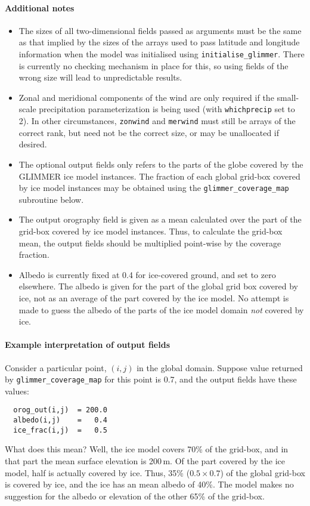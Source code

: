 \paragraph{Additional notes}
%
\begin{itemize}
\item The sizes of all two-dimensional fields passed as arguments must be the
  same as that implied by the sizes of the arrays used to pass latitude and
  longitude information when the model was initialised using
  \texttt{initialise\_glimmer}. There is
  currently no checking mechanism in place for this, so using fields of the wrong size
  will lead to unpredictable results.
\item Zonal and meridional components of the wind are only required if the
  small-scale precipitation parameterization is being used (with
  \texttt{whichprecip} set to 2). In other circumstances, \texttt{zonwind} and
  \texttt{merwind} must still be arrays of the correct rank, but need not be
  the correct size, or may be unallocated if desired.
\item The optional output fields only refers to the parts of the globe
  covered by the GLIMMER ice model instances. The fraction of each global
  grid-box covered by ice model instances may be obtained using the
  \texttt{glimmer\_coverage\_map} subroutine below. 
\item The output orography field is given as a mean calculated over the part
  of the grid-box covered by ice  model instances. Thus, to calculate the
  grid-box mean, the output fields should be multiplied point-wise by the
  coverage fraction. 
\item Albedo is currently fixed at 0.4 for ice-covered ground, and set to zero
  elsewhere. The albedo is given for the part of the global grid box covered
  by ice, not as an average of the part covered by the ice model. No attempt
  is made to guess the albedo of the parts of the ice model domain \emph{not}
  covered by ice.
\end{itemize}
%
\paragraph{Example interpretation of output fields}
%
Consider a particular point, $(i,j)$ in the global domain. Suppose value
returned by \texttt{glimmer\_coverage\_map} for this point is 0.7, and the
output fields have these values:
\begin{verbatim}
  orog_out(i,j)  = 200.0
  albedo(i,j)    =   0.4
  ice_frac(i,j)  =   0.5
\end{verbatim}
%
What does this mean? Well, the ice model covers 70\% of the grid-box, and in
that part the mean surface elevation is 200\,m. Of the part covered by the ice
model, half is actually covered by ice. Thus, 35\% ($0.5\times 0.7$) of the global grid-box is
covered by ice, and the ice has an mean albedo of 40\%. The model makes no suggestion for the
albedo or elevation of the other 65\% of the grid-box.
%
